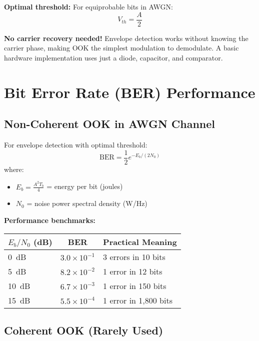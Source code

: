 \textbf{Optimal threshold:} For equiprobable bits in AWGN:
\begin{equation}
V_{th} = \frac{A}{2}
\end{equation}

\begin{keyconcept}
\textbf{No carrier recovery needed!} Envelope detection works without knowing the carrier phase, making OOK the simplest modulation to demodulate. A basic hardware implementation uses just a diode, capacitor, and comparator.
\end{keyconcept}

\section{Bit Error Rate (BER) Performance}

\subsection{Non-Coherent OOK in AWGN Channel}

For envelope detection with optimal threshold:
\begin{equation}
\mathrm{BER} = \frac{1}{2}e^{-E_b/(2N_0)}
\end{equation}
where:
\begin{itemize}
\item $E_b = \frac{A^2 T_b}{4}$ = energy per bit (joules)
\item $N_0$ = noise power spectral density (W/Hz)
\end{itemize}

\textbf{Performance benchmarks:}

\begin{center}
\begin{tabular}{@{}lrl@{}}
\toprule
$E_b/N_0$ (dB) & \multicolumn{1}{c}{BER} & Practical Meaning \\
\midrule
0~dB & $3.0 \times 10^{-1}$ & 3 errors in 10 bits \\
5~dB & $8.2 \times 10^{-2}$ & 1 error in 12 bits \\
10~dB & $6.7 \times 10^{-3}$ & 1 error in 150 bits \\
15~dB & $5.5 \times 10^{-4}$ & 1 error in 1,800 bits \\
\bottomrule
\end{tabular}
\end{center}

\subsection{Coherent OOK (Rarely Used)}

